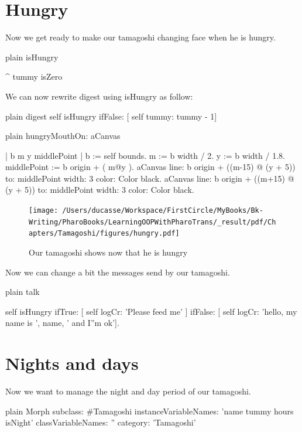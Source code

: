 \documentclass[10pt,twoside,english]{_support/latex/sbabook/sbabook}
\begin{document}
\section{Hungry}
Now we get ready to make our tamagoshi changing face when he is hungry. 

\begin{displaycode}{plain}
isHungry

	^ tummy isZero
\end{displaycode}

We can now rewrite digest using isHungry as follow:

\begin{displaycode}{plain}
digest
	self isHungry
		ifFalse: [ self tummy: tummy - 1]
\end{displaycode}

\begin{displaycode}{plain}
hungryMouthOn: aCanvas

	| b m y middlePoint |
	b := self bounds.
	m := b width / 2.
	y := b width / 1.8.
	middlePoint := b origin +  ( m@y ).
	aCanvas 
		line: b origin + ((m-15) @ (y + 5)) to:  middlePoint width: 3 color: Color black.
	aCanvas 
		line: b origin + ((m+15) @ (y + 5)) to: middlePoint width: 3 color: Color black.
\end{displaycode}


\begin{figure}

\begin{center}
\texttt{[image: /Users/ducasse/Workspace/FirstCircle/MyBooks/Bk-Writing/PharoBooks/LearningOOPWithPharoTrans/\_result/pdf/Chapters/Tamagoshi/figures/hungry.pdf]}\caption{Our tamagoshi shows now that he is hungry\label{hungry}}\end{center}
\end{figure}


Now we can change a bit the messages send by our tamagoshi. 

\begin{displaycode}{plain}
talk

	self isHungry
		ifTrue: [ self logCr: 'Please feed me' ]
		ifFalse: [ self logCr: 'hello, my name is ', name, ' and I''m ok'].
\end{displaycode}
\section{Nights and days}
Now we want to manage the night and day period of our tamagoshi. 

\begin{displaycode}{plain}
Morph subclass: #Tamagoshi
	instanceVariableNames: 'name tummy hours isNight'
	classVariableNames: ''
	category: 'Tamagoshi'
\end{displaycode}
\end{document}
